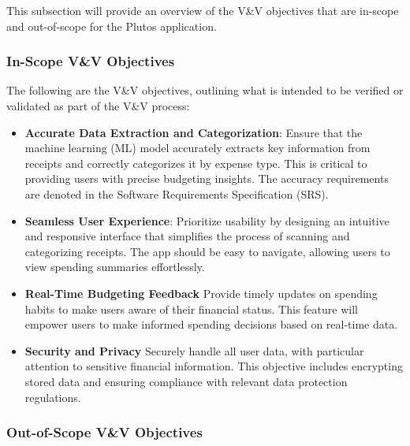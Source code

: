 \documentclass[12pt, titlepage]{article}
\begin{document}
This subsection will provide an overview of the V\&V objectives that are
in-scope and out-of-scope for the Plutos application.

\subsubsection{In-Scope V\&V Objectives}

The following are the V\&V objectives, outlining what is intended to be verified
or validated as part of the V\&V process: 
\begin{itemize}
	\item \textbf{Accurate Data Extraction and Categorization}: Ensure that the
machine learning (ML) model accurately extracts key information from receipts
and correctly categorizes it by expense type. This is critical to providing
users with precise budgeting insights. The accuracy requirements are denoted in
the Software Requirements Specification (SRS).
	\item \textbf{Seamless User Experience}: Prioritize usability by designing
an intuitive and responsive interface that simplifies the process of scanning
and categorizing receipts. The app should be easy to navigate, allowing users to
view spending summaries effortlessly. 
	\item \textbf{Real-Time Budgeting Feedback} Provide timely updates on
spending habits to make users aware of their financial status. This feature will
empower users to make informed spending decisions based on real-time data.
	\item \textbf{Security and Privacy} Securely handle all user data, with
particular attention to sensitive financial information. This objective includes
encrypting stored data and ensuring compliance with relevant data protection
regulations. 
\end{itemize}

\subsubsection{Out-of-Scope V\&V Objectives}
\end{document}
